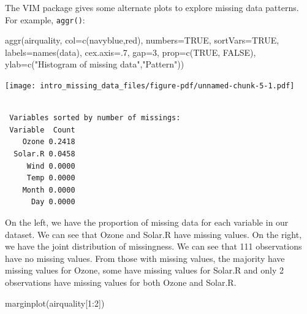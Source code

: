 \documentclass[
  letterpaper,
  DIV=11,
  numbers=noendperiod]{scrreprt}
\newenvironment{Shaded}{}{}
\newcommand{\AttributeTok}[1]{\textcolor[rgb]{0.49,0.56,0.16}{#1}}
\newcommand{\ConstantTok}[1]{\textcolor[rgb]{0.53,0.00,0.00}{#1}}
\newcommand{\DecValTok}[1]{\textcolor[rgb]{0.25,0.63,0.44}{#1}}
\newcommand{\FunctionTok}[1]{\textcolor[rgb]{0.02,0.16,0.49}{#1}}
\newcommand{\NormalTok}[1]{#1}
\newcommand{\SpecialCharTok}[1]{\textcolor[rgb]{0.25,0.44,0.63}{#1}}
\newcommand{\StringTok}[1]{\textcolor[rgb]{0.25,0.44,0.63}{#1}}
\begin{document}
The VIM package gives some alternate plots to explore missing data
patterns. For example, \texttt{aggr()}:

\begin{Shaded}
\begin{Highlighting}[]
 \FunctionTok{aggr}\NormalTok{(airquality, }\AttributeTok{col=}\FunctionTok{c}\NormalTok{(}\StringTok{\textquotesingle{}navyblue\textquotesingle{}}\NormalTok{,}\StringTok{\textquotesingle{}red\textquotesingle{}}\NormalTok{),}
      \AttributeTok{numbers=}\ConstantTok{TRUE}\NormalTok{, }\AttributeTok{sortVars=}\ConstantTok{TRUE}\NormalTok{, }\AttributeTok{labels=}\FunctionTok{names}\NormalTok{(data),}
      \AttributeTok{cex.axis=}\NormalTok{.}\DecValTok{7}\NormalTok{, }\AttributeTok{gap=}\DecValTok{3}\NormalTok{, }\AttributeTok{prop=}\FunctionTok{c}\NormalTok{(}\ConstantTok{TRUE}\NormalTok{, }\ConstantTok{FALSE}\NormalTok{), }
      \AttributeTok{ylab=}\FunctionTok{c}\NormalTok{(}\StringTok{"Histogram of missing data"}\NormalTok{,}\StringTok{"Pattern"}\NormalTok{))}
\end{Highlighting}
\end{Shaded}

\begin{center}
\texttt{[image: intro\_missing\_data\_files/figure-pdf/unnamed-chunk-5-1.pdf]}
\end{center}

\begin{verbatim}

 Variables sorted by number of missings: 
 Variable  Count
    Ozone 0.2418
  Solar.R 0.0458
     Wind 0.0000
     Temp 0.0000
    Month 0.0000
      Day 0.0000
\end{verbatim}

On the left, we have the proportion of missing data for each variable in
our dataset. We can see that Ozone and Solar.R have missing values. On
the right, we have the joint distribution of missingness. We can see
that 111 observations have no missing values. From those with missing
values, the majority have missing values for Ozone, some have missing
values for Solar.R and only 2 observations have missing values for both
Ozone and Solar.R.

\begin{Shaded}
\begin{Highlighting}[]
  \FunctionTok{marginplot}\NormalTok{(airquality[}\DecValTok{1}\SpecialCharTok{:}\DecValTok{2}\NormalTok{])}
\end{Highlighting}
\end{Shaded}
\end{document}
